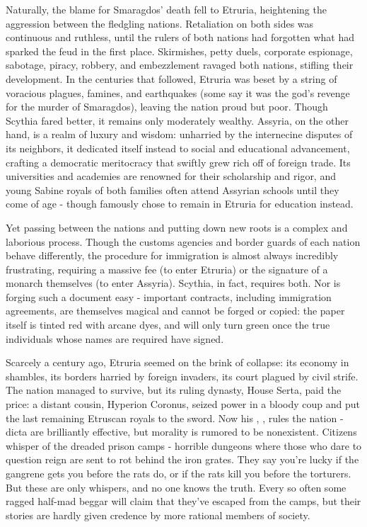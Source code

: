 \documentclass[blue]{Kos}
\begin{document}
Naturally, the blame for Smaragdos' death fell to Etruria, heightening the aggression between the fledgling nations. Retaliation on both sides was continuous and ruthless, until the rulers of both nations had forgotten what had sparked the feud in the first place. Skirmishes, petty duels, corporate espionage, sabotage, piracy, robbery, and embezzlement ravaged both nations, stifling their development. In the centuries that followed, Etruria was beset by a string of voracious plagues, famines, and earthquakes (some say it was the god’s revenge for the murder of Smaragdos), leaving the nation proud but poor. Though Scythia fared better, it remains only moderately wealthy. Assyria, on the other hand, is a realm of luxury and wisdom: unharried by the internecine disputes of its neighbors, it dedicated itself instead to social and educational advancement, crafting a democratic meritocracy that swiftly grew rich off of foreign trade. Its universities and academies are renowned for their scholarship and rigor, and young Sabine royals of both families often attend Assyrian schools until they come of age - though \cGroom{} famously chose to remain in Etruria for \cGroom{\their} education instead.

Yet passing between the nations and putting down new roots is a complex and laborious process. Though the customs agencies and border guards of each nation behave differently, the procedure for immigration is almost always incredibly frustrating, requiring a massive fee (to enter Etruria) or the signature of a monarch themselves (to enter Assyria). Scythia, in fact, requires both. Nor is forging such a document easy - important contracts, including immigration agreements, are themselves magical and cannot be forged or copied: the paper itself is tinted red with arcane dyes, and will only turn green once the true individuals whose names are required have signed.

Scarcely a century ago, Etruria seemed on the brink of collapse: its economy in shambles, its borders harried by foreign invaders, its court plagued by civil strife. The nation managed to survive, but its ruling dynasty, House Serta, paid the price: a distant cousin, Hyperion Coronus, seized power in a bloody coup and put the last remaining Etruscan royals to the sword. Now his \cEtruriaKing{\offspring}, \cEtruriaKing{}, rules the nation - \cEtruriaKing{\their} dicta are brilliantly effective, but \cEtruriaKing{\their} morality is rumored to be nonexistent. Citizens whisper of the dreaded prison camps - horrible dungeons where those who dare to question \cEtruriaKing{\their} reign are sent to rot behind the iron grates. They say you're lucky if the gangrene gets you before the rats do, or if the rats kill you before the torturers. But these are only whispers, and no one knows the truth. Every so often some ragged half-mad beggar will claim that they've escaped from the camps, but their stories are hardly given credence by more rational members of society.
\end{document}
